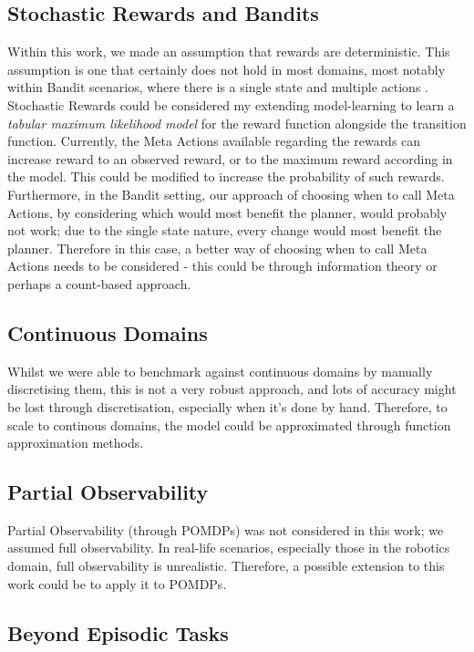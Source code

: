 \subsection{Stochastic Rewards and Bandits}
Within this work, we made an assumption that rewards are deterministic. This assumption is one that certainly does not hold in most domains, most notably within Bandit scenarios, where there is a single state and multiple actions \citep{lattimore}. Stochastic Rewards could be considered my extending model-learning to learn a \textit{tabular maximum likelihood model} for the reward function alongside the transition function. Currently, the Meta Actions available regarding the rewards can increase reward to an observed reward, or to the maximum reward according in the model. This could be modified to increase the probability of such rewards. Furthermore, in the Bandit setting, our approach of choosing when to call Meta Actions, by considering which would most benefit the planner, would probably not work; due to the single state nature, every change would most benefit the planner. Therefore in this case, a better way of choosing when to call Meta Actions needs to be considered - this could be through information theory or perhaps a count-based approach.
\subsection{Continuous Domains}
Whilst we were able to benchmark against continuous domains by manually discretising them, this is not a very robust approach, and lots of accuracy might be lost through discretisation, especially when it's done by hand. Therefore, to scale to continous domains, the model could be approximated through function approximation methods.
\subsection{Partial Observability}
Partial Observability (through POMDPs) was not considered in this work; we assumed full observability. In real-life scenarios, especially those in the robotics domain, full observability is unrealistic. Therefore, a possible extension to this work could be to apply it to POMDPs.
\subsection{Beyond Episodic Tasks}
